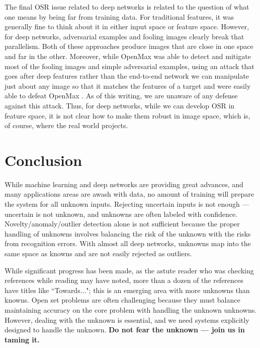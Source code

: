 \documentclass[letterpaper]{article}
\begin{document}
The final OSR issue related to deep networks is related to the question of what one means by being far from training data.  For traditional features, it was generally fine to think about it in either input space or feature space.  However, for deep networks,  adversarial examples \cite{szegedy2013intriguing} and fooling images  \cite{nguyen2015deep}  clearly break that parallelism.  Both of these approaches produce images that are close in one space and far in the other.  Moreover, while OpenMax was able to detect and mitigate most of the fooling images and simple adversarial examples, using an attack that goes after deep features rather than the end-to-end network we can manipulate just about any image so that it matches the features of a target and were easily able to defeat OpenMax \cite{rozsa2017adversarial}.  As of this writing, we are unaware of any defense against this attack.  Thus, for deep networks, while we can develop OSR in feature space, it is not clear how to make them robust in image space, which is, of course, where the real world projects. 



\section{Conclusion}

While machine learning and deep networks are providing great advances, and many applications areas are awash with data, no amount of training will prepare the system for all unknown inputs.    
Rejecting uncertain inputs is not enough  --- uncertain is not unknown, and unknowns are often labeled with confidence.   Novelty/anomaly/outlier detection alone is not sufficient because the proper handling of unknowns involves balancing the risk of the unknown with the risks from recognition errors.  With almost all deep networks, unknowns map into the same space as knowns and are not easily rejected as outliers.


While significant progress has been made, as the astute reader who was checking references while reading may have noted, more than a dozen of the references have titles like ``Towards..."; this is an emerging area with more unknowns than knowns.
Open set problems are often challenging because they must balance maintaining accuracy on the core problem with handling the unknown unknowns.
However, dealing with the unknown is essential, and we need systems explicitly designed to handle the unknown.
{\bf {Do not fear the unknown ---} {join us in taming it.}
}
\end{document}
